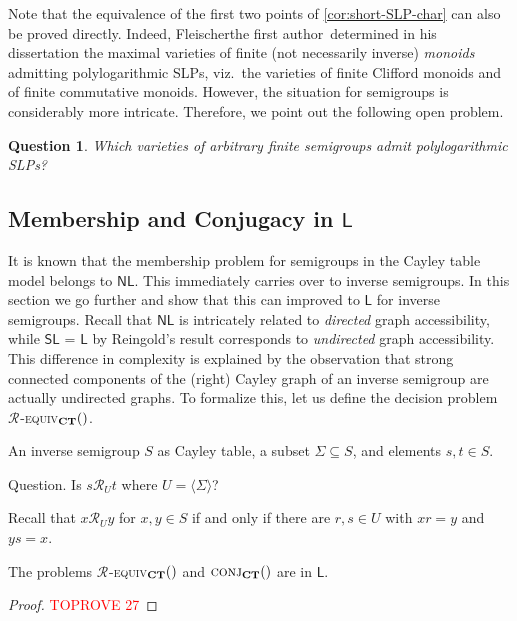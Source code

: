 \documentclass[anonymous,letter,UKenglish,cleveref,autoref,thm-restate]{lipics-v2021}
\makeatletter
\newcommand{\sse}{\subseteq}
\newcommand{\gen}[1]{\langle #1 \rangle}
\newcommand{\LOGSPACE}{\ensuremath{\mathsf{L}}\xspace}
\newcommand{\NL}{\ensuremath{\mathsf{NL}}\xspace}
\newcommand{\SL}{\ensuremath{\mathsf{SL}}\xspace}
\newcommand*{\gR}[1][]{\mathrel{\mathcal{R}_{#1}}}
\theoremstyle{plain}
\newtheorem{question}[theorem]{Question}
\theoremstyle{plain}
\providecommand\iitem{}
\providecommand\qitem{}
\newcommand\decproblem@iitem@label{\rlap{Input.}\phantom{Question.}}
\newcommand\decproblem@qitem@label{Question.}
\newenvironment{decproblem}{\begin{description}\begin{samepage}\renewcommand{\iitem}{\item[\decproblem@iitem@label]}\renewcommand{\qitem}{\item[\decproblem@qitem@label]}}{\end{samepage}\end{description}}
\newcommand{\dConj}[2][]{\textup{\textsc{conj${}_{\mathbf{#1}}\expandafter\ifx\expandafter\relax\detokenize{#2}\relax\else(#2)\fi$}}}
\newcommand{\dRequiv}[2][]{\textup{\textsc{\ensuremath{\gR}-equiv${}_{\mathbf{#1}}\expandafter\ifx\expandafter\relax\detokenize{#2}\relax\else(#2)\fi$}}}
\makeatother
\begin{document}
Note that the equivalence of the first two points of \cref{cor:short-SLP-char} can also be proved directly. 
Indeed, 
\ifAnonimous Fleischer\else the first author\fi\ 
determined in his dissertation \cite{Fleischer19diss} the maximal varieties of finite (not necessarily inverse) \emph{monoids} admitting polylogarithmic SLPs, viz.\ the varieties of finite Clifford monoids and of finite commutative monoids.
However, the situation for semigroups is considerably more intricate.
Therefore, we point out the following open problem.


\begin{question}
  Which varieties of arbitrary finite semigroups admit polylogarithmic SLPs?
\end{question}


\subsection{Membership and Conjugacy in \LOGSPACE}\label{sec:CT-SL}


It is known that the membership problem for semigroups in the Cayley table model belongs to \NL \cite{JonesLL76}.
This immediately carries over to inverse semigroups.
In this section we go further and show that this can improved to \LOGSPACE for inverse semigroups.
Recall that \NL is intricately related to \emph{directed} graph accessibility, while \SL{} = \LOGSPACE by Reingold's result \cite{Reingold08} corresponds to \emph{undirected} graph accessibility.
This difference in complexity is explained by the observation that strong connected components of the (right) Cayley graph of an inverse semigroup are actually undirected graphs.
To formalize this, let us define the decision problem \dRequiv[CT]{}.


\begin{decproblem}
	\iitem An inverse semigroup $S$ as Cayley table, a subset $\Sigma \sse S$, and elements $s, t \in S$.
	\qitem Is $s \gR[U] t$ where $U = \gen{\Sigma}$?
\end{decproblem}

	Recall that $x \gR[U] y$ for $x,y \in S$ if and only if there are $r,s \in  U $ with $xr=y$ and $ys = x$.

\begin{proposition}\label{lem:conj_reachability}
	The problems \dRequiv[CT]{} and $\dConj[CT]{}$ are in \LOGSPACE.
\end{proposition}

\begin{proof}\textcolor{red}{TOPROVE 27}\end{proof}
\end{document}
